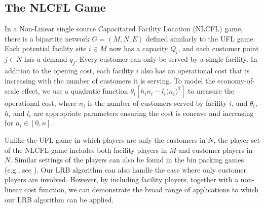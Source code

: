 \documentclass[ijoc,nonblindrev]{informs3} %
\begin{document}
\subsection{The NLCFL Game}\label{section:NLCFL}
In a Non-Linear single source Capacitated Facility Location (NLCFL) game, there is a bipartite network $G=(M,N,E)$ defined similarly to the UFL game. Each potential facility site $i \in M$ now has a capacity $Q_i$, and each customer point $j \in N$ has a demand $q_j$. Every customer can only be served by a single facility.
In addition to the opening cost, each facility $i$ also has an operational cost that is increasing with the number of customers it is serving. To model the economy-of-scale effect, we use  a quadratic function  $\theta_i[h_i n_i - l_i\big(n_i \big)^2]$ to measure the operational cost, where $n_i$ is the number of customers served by facility $i$, and $\theta_i$, $h_i$ and $l_i$ are appropriate parameters ensuring the cost is concave and increasing  for $n_i \in [0,n]$. 


Unlike the UFL game in which players are only the customers in $N$, the player set of the NLCFL game includes both facility players in $M$ and customer players in $N$. Similar settings of the players can also be found in the bin packing games (e.g., see \citealt{Faigle1993,Liu2009}).
Our LRB algorithm can also handle the case where only customer players are involved. However, by including facility players, together with a non-linear cost function, we can demonstrate the broad range of applications to which our LRB algorithm can be applied.

%
\end{document}
